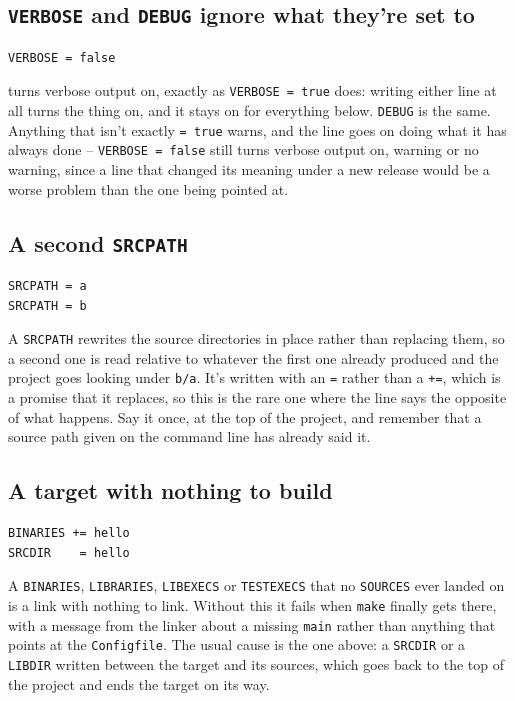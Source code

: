 \documentclass{article}
\begin{document}
\subsection{\texttt{VERBOSE} and \texttt{DEBUG} ignore what they're set to}

\begin{verbatim}
VERBOSE = false
\end{verbatim}

turns verbose output on, exactly as \texttt{VERBOSE = true} does:
writing either line at all turns the thing on, and it stays on for
everything below.  \texttt{DEBUG} is the same.  Anything that isn't
exactly \texttt{= true} warns, and the line goes on doing what it has
always done -- \texttt{VERBOSE = false} still turns verbose output on,
warning or no warning, since a line that changed its meaning under a
new release would be a worse problem than the one being pointed at.

\subsection{A second \texttt{SRCPATH}}

\begin{verbatim}
SRCPATH = a
SRCPATH = b
\end{verbatim}

A \texttt{SRCPATH} rewrites the source directories in place rather
than replacing them, so a second one is read relative to whatever the
first one already produced and the project goes looking under
\texttt{b/a}.  It's written with an \texttt{=} rather than a
\texttt{+=}, which is a promise that it replaces, so this is the rare
one where the line says the opposite of what happens.  Say it once, at
the top of the project, and remember that a source path given on the
command line has already said it.

\subsection{A target with nothing to build}

\begin{verbatim}
BINARIES += hello
SRCDIR    = hello
\end{verbatim}

A \texttt{BINARIES}, \texttt{LIBRARIES}, \texttt{LIBEXECS} or
\texttt{TESTEXECS} that no \texttt{SOURCES} ever landed on is a link
with nothing to link.  Without this it fails when \texttt{make}
finally gets there, with a message from the linker about a missing
\texttt{main} rather than anything that points at the
\texttt{Configfile}.  The usual cause is the one above: a
\texttt{SRCDIR} or a \texttt{LIBDIR} written between the target and
its sources, which goes back to the top of the project and ends the
target on its way.
\end{document}
